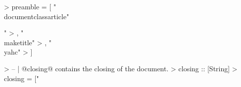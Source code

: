 > preamble = [ "\\documentclass{article}"
\begin{document}
"
>          , "\\maketitle"
>          , "\\yahc"
>          ]

> -- | @closing@ contains the closing of the document.
> closing :: [String]
> closing = ["\
\end{document}
